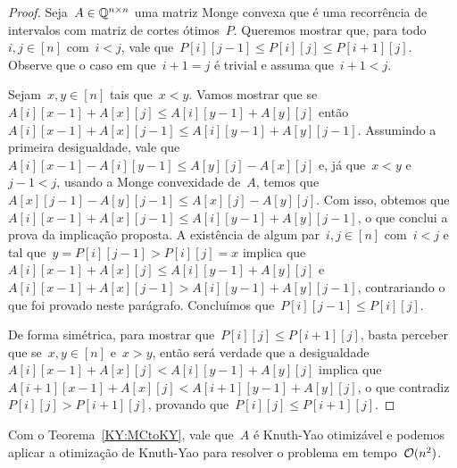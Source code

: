 \begin{proof}
Seja~$A \in \mathbb{Q}^{n \times n}$ uma matriz Monge convexa que é uma recorrência de intervalos com matriz de cortes ótimos~$P$. Queremos mostrar que, para todo~$i,j \in [n]$ com~$i < j$, vale que~${P[i][j-1] \leq P[i][j] \leq P[i+1][j]}$. Observe que o caso em que~${i + 1 = j}$ é trivial e assuma que~${i + 1 < j}$.

Sejam~${x,y \in[n]}$ tais que~$x < y$. Vamos mostrar que se~${A[i][x-1] + A[x][j] \leq A[i][y-1] + A[y][j]}$ então~${A[i][x-1] + A[x][j-1] \leq A[i][y-1] + A[y][j-1]}$. Assumindo a primeira desigualdade, vale que~${A[i][x-1] - A[i][y-1] \leq A[y][j] - A[x][j]}$ e, já que~${x < y}$ e~${j-1 < j}$, usando a Monge convexidade de~$A$, temos que~${A[x][j-1] - A[y][j-1] \leq A[x][j] - A[y][j]}$. Com isso, obtemos que~${A[i][x-1] + A[x][j-1] \leq A[i][y-1] + A[y][j-1]}$, o que conclui a prova da implicação proposta. A existência de algum par~$i,j \in [n]$ com~$i < j$ e tal que~${y = P[i][j-1] > P[i][j] = x}$ implica que~${A[i][x-1] + A[x][j] \leq A[i][y-1] + A[y][j]}$ e~${A[i][x-1] + A[x][j-1] > A[i][y-1] + A[y][j-1]}$, contrariando o que foi provado neste parágrafo. Concluímos que~${P[i][j-1] \leq P[i][j]}$. 

De forma simétrica, para mostrar que~${P[i][j] \leq P[i+1][j]}$, basta perceber que se~${x,y \in [n]}$ e~${x > y}$, então será verdade que a desigualdade~${A[i][x-1] + A[x][j] < A[i][y-1] + A[y][j]}$ implica que~${A[i+1][x-1] + A[x][j] < A[i+1][y-1] + A[y][j]}$, o que contradiz~${P[i][j] > P[i+1][j]}$, provando que~${P[i][j] \leq P[i+1][j]}$.
\end{proof}

Com o Teorema~\ref{KY:MCtoKY}, vale que~$A$ é Knuth-Yao otimizável e podemos aplicar a otimização de Knuth-Yao para resolver o problema em tempo~$\mathcal{O}(n^2)$.

